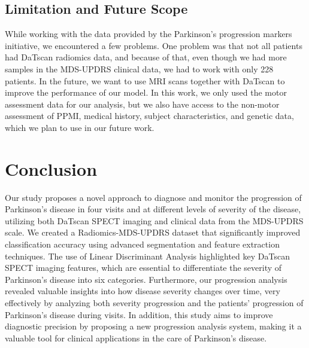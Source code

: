\documentclass{article}
\begin{document}
\subsection{Limitation and Future Scope}
While working with the data provided by the Parkinson's progression markers initiative, we encountered a few problems. One problem was that not all patients had DaTscan radiomics data, and because of that, even though we had more samples in the MDS-UPDRS clinical data, we had to work with only 228 patients.
In the future, we want to use MRI scans together with DaTscan to improve the performance of our model. In this work, we only used the motor assessment data for our analysis, but we also have access to the non-motor assessment of PPMI, medical history, subject characteristics, and genetic data, which we plan to use in our future work.


\section{Conclusion}
\label{Conclusion}

Our study proposes a novel approach to diagnose and monitor the progression of Parkinson's disease in four visits and at different levels of severity of the disease, utilizing both DaTscan SPECT imaging and clinical data from the MDS-UPDRS scale. We created a Radiomics-MDS-UPDRS dataset that significantly improved classification accuracy using advanced segmentation and feature extraction techniques. The use of Linear Discriminant Analysis highlighted key DaTscan SPECT imaging features, which are essential to differentiate the severity of Parkinson's disease into six categories. Furthermore, our progression analysis revealed valuable insights into how disease severity changes over time, very effectively by analyzing both severity progression and the patients' progression of Parkinson's disease during visits. In addition, this study aims to improve diagnostic precision by proposing a new progression analysis system, making it a valuable tool for clinical applications in the care of Parkinson's disease.
\end{document}

